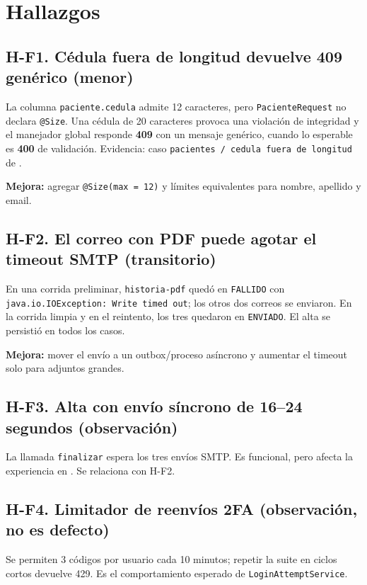 \documentclass[11pt]{article}
\begin{document}
\section{Hallazgos}

\subsection*{H-F1. Cédula fuera de longitud devuelve 409 genérico (menor)}

La columna \texttt{paciente.cedula} admite 12 caracteres, pero
\texttt{PacienteRequest} no declara \texttt{@Size}. Una cédula de 20 caracteres
provoca una violación de integridad y el manejador global responde
\textbf{409} con un mensaje genérico, cuando lo esperable es \textbf{400} de
validación. Evidencia: caso \texttt{pacientes / cedula fuera de longitud} de
.

\textbf{Mejora:} agregar \texttt{@Size(max = 12)} y límites equivalentes para
nombre, apellido y email.

\subsection*{H-F2. El correo con PDF puede agotar el timeout SMTP (transitorio)}

En una corrida preliminar, \texttt{historia-pdf} quedó en \texttt{FALLIDO} con
\texttt{java.io.IOException: Write timed out}; los otros dos correos se
enviaron. En la corrida limpia y en el reintento, los tres quedaron en
\texttt{ENVIADO}. El alta se persistió en todos los casos.

\textbf{Mejora:} mover el envío a un outbox/proceso asíncrono y aumentar el
timeout solo para adjuntos grandes.

\subsection*{H-F3. Alta con envío síncrono de 16--24 segundos (observación)}

La llamada \texttt{finalizar} espera los tres envíos SMTP. Es funcional, pero
afecta la experiencia en . Se relaciona con H-F2.

\subsection*{H-F4. Limitador de reenvíos 2FA (observación, no es defecto)}

Se permiten 3 códigos por usuario cada 10 minutos; repetir la suite en ciclos
cortos devuelve 429. Es el comportamiento esperado de
\texttt{LoginAttemptService}.
\end{document}
